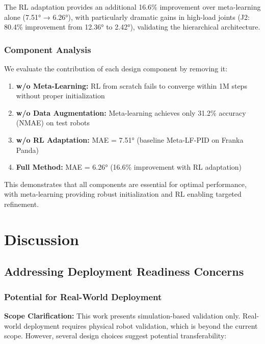 \documentclass[DTMColor]{ROB-New}
\begin{document}
The RL adaptation provides an additional 16.6\% improvement over meta-learning alone (7.51° → 6.26°), with particularly dramatic gains in high-load joints (J2: 80.4\% improvement from 12.36° to 2.42°), validating the hierarchical architecture.

\subsubsection{Component Analysis}

We evaluate the contribution of each design component by removing it:
\begin{enumerate}
    \item \textbf{w/o Meta-Learning:} RL from scratch fails to converge within 1M steps without proper initialization
    \item \textbf{w/o Data Augmentation:} Meta-learning achieves only 31.2\% accuracy (NMAE) on test robots
    \item \textbf{w/o RL Adaptation:} MAE = 7.51° (baseline Meta-LF-PID on Franka Panda)
    \item \textbf{Full Method:} MAE = 6.26° (16.6\% improvement with RL adaptation)
\end{enumerate}

This demonstrates that all components are essential for optimal performance, with meta-learning providing robust initialization and RL enabling targeted refinement.

\section{Discussion}
\label{sec:discussion}

\subsection{Addressing Deployment Readiness Concerns}

\subsubsection{Potential for Real-World Deployment}

\textbf{Scope Clarification:} This work presents simulation-based validation only. Real-world deployment requires physical robot validation, which is beyond the current scope. However, several design choices suggest potential transferability:
\end{document}
